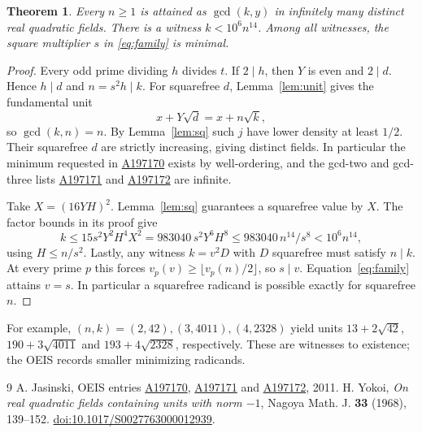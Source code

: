 \documentclass[11pt,letterpaper]{article}
\newtheorem{theorem}{Theorem}
\newcommand{\oeis}[1]{\href{https://oeis.org/A#1}{A#1}}
\begin{document}
\begin{theorem}
Every $n\ge1$ is attained as $\gcd(k,y)$ in infinitely many distinct real quadratic fields. There is a witness $k<10^6n^{14}$. Among all witnesses, the square multiplier $s$ in \eqref{eq:family} is minimal.
\end{theorem}
\begin{proof}
Every odd prime dividing $h$ divides $t$. If $2\mid h$, then $Y$ is even and $2\mid d$. Hence $h\mid d$ and $n=s^2h\mid k$. For squarefree $d$, Lemma~\ref{lem:unit} gives the fundamental unit
\[
                    x+Y\sqrt d=x+n\sqrt k ,
\]
so $\gcd(k,n)=n$. By Lemma~\ref{lem:sq} such $j$ have lower density at least $1/2$. Their squarefree $d$ are strictly increasing, giving distinct fields. In particular the minimum requested in \oeis{197170} exists by well-ordering, and the gcd-two and gcd-three lists \oeis{197171} and \oeis{197172} are infinite.

Take $X=(16YH)^2$. Lemma~\ref{lem:sq} guarantees a squarefree value by $X$. The factor bounds in its proof give
\[
 k\le15s^2Y^2H^4X^2
   =983040\,s^2Y^6H^8
   \le983040\,n^{14}/s^8<10^6 n^{14},
\]
using $H\le n/s^2$. Lastly, any witness $k=v^2D$ with $D$ squarefree must satisfy $n\mid k$. At every prime $p$ this forces $v_p(v)\ge\lfloor v_p(n)/2\rfloor$, so $s\mid v$. Equation~\eqref{eq:family} attains $v=s$. In particular a squarefree radicand is possible exactly for squarefree $n$.
\end{proof}

For example, $(n,k)=(2,42),(3,4011),(4,2328)$ yield units
$13+2\sqrt{42}$, $190+3\sqrt{4011}$ and $193+4\sqrt{2328}$, respectively. These are witnesses to existence; the OEIS records smaller minimizing radicands.

\begin{thebibliography}{9}
 A. Jasinski, OEIS entries \oeis{197170}, \oeis{197171} and \oeis{197172}, 2011.
 H. Yokoi, \emph{On real quadratic fields containing units with norm $-1$}, Nagoya Math. J. \textbf{33} (1968), 139--152. \href{https://doi.org/10.1017/S0027763000012939}{doi:10.1017/S0027763000012939}.
\end{thebibliography}
\end{document}

